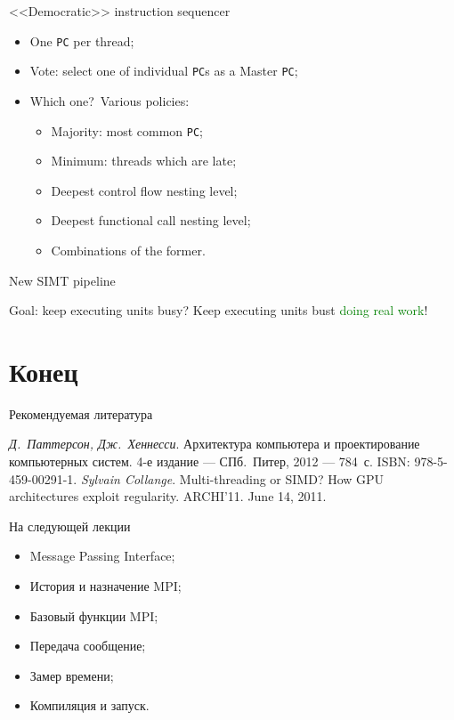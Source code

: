 \begin{frame}{<<Democratic>> instruction sequencer}
\begin{itemize}
    \item One \texttt{PC} per thread;\pause
    \item Vote: select one of individual \texttt{PC}s as a Master \texttt{PC};\pause
    \item Which one?\pause~Various policies:
    \begin{itemize}
        \item Majority: most common \texttt{PC};
        \item Minimum: threads which are late;
        \item Deepest control flow  nesting level;
        \item Deepest functional call nesting level;
        \item Combinations of the former.
    \end{itemize}
\end{itemize}
\end{frame}

\begin{frame}{New SIMT pipeline}
\centering
{}
\end{frame}

\begin{frame}
Goal: keep executing units busy?
\pause\vfill
Keep executing units bust \textcolor{green}{doing real work}!
\end{frame}

\section*{Конец}

\begin{frame}{Рекомендуемая литература}
\begin{thebibliography}{99}
    \bibitem{} \textit{Д.~Паттерсон, Дж.~Хеннесси}. Архитектура компьютера и
    проектирование компьютерных систем. 4-е издание --- СПб.~Питер, 2012 ---
    784~с. ISBN: 978-5-459-00291-1.
    \bibitem{} \textit{Sylvain Collange}. Multi-threading or SIMD? How GPU
    architectures exploit regularity. ARCHI'11. June 14, 2011.
    \end{thebibliography}
\end{frame}

\begin{frame}{На следующей лекции}
\begin{itemize}
\ifsbertech
    \item Message Passing Interface;
    \item История и назначение MPI;
    \item Базовый функции MPI;
    \item Передача сообщение;
    \item Замер времени;
    \item Компиляция и запуск.
\fi
\end{itemize}
\end{frame}

